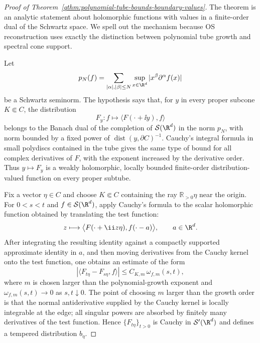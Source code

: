 \begin{proof}[Proof of Theorem~\ref{qthm:polynomial-tube-bounds-boundary-values}]
The theorem is an analytic statement about holomorphic functions with values
in a finite-order dual of the Schwartz space.  We spell out the mechanism
because OS reconstruction uses exactly the distinction between polynomial
tube growth and spectral cone support.

Let
\[
  p_N(f)
  =
  \sum_{|\alpha|,|\beta|\le N}
    \sup_{x\in\R^d}|x^\beta\partial^\alpha f(x)|
\]
be a Schwartz seminorm.  The hypothesis says that, for \(y\) in every proper
subcone \(K\Subset C\), the distribution
\[
  F_y:f\longmapsto \langle F(\cdot+\ii y),f\rangle
\]
belongs to the Banach dual of the completion of
\(\mathcal S(\R^d)\) in the norm \(p_N\), with norm bounded by a fixed power
of \(\operatorname{dist}(y,\partial C)^{-1}\).  Cauchy's integral formula in
small polydiscs contained in the tube gives the same type of bound for all
complex derivatives of \(F\), with the exponent increased by the derivative
order.  Thus \(y\mapsto F_y\) is a weakly holomorphic, locally bounded
finite-order distribution-valued function on every proper subtube.

Fix a vector \(\eta\in C\) and choose \(K\Subset C\) containing the ray
\(\mathbb R_{>0}\eta\) near the origin.  For \(0<s<t\) and
\(f\in\mathcal S(\R^d)\), apply Cauchy's formula to the scalar holomorphic
function obtained by translating the test function:
\[
  z\longmapsto
  \bigl\langle F(\cdot+\ii z\eta), f(\cdot-a)\bigr\rangle ,
  \qquad a\in\R^d .
\]
After integrating the resulting identity against a compactly supported
approximate identity in \(a\), and then moving derivatives from the Cauchy
kernel onto the test function, one obtains an estimate of the form
\begin{equation}
  |\langle F_{t\eta}-F_{s\eta},f\rangle|
  \le
  C_{K,m}\,
  \omega_{f,m}(s,t),
  \label{eq:os-tube-boundary-cauchy}
\end{equation}
where \(m\) is chosen larger than the polynomial-growth exponent and
\(\omega_{f,m}(s,t)\to0\) as \(s,t\downarrow0\).  The point of choosing
\(m\) larger than the growth order is that the normal antiderivative supplied
by the Cauchy kernel is locally integrable at the edge; all singular powers
are absorbed by finitely many derivatives of the test function.  Hence
\(\{F_{t\eta}\}_{t>0}\) is Cauchy in \(\mathcal S'(\R^d)\) and defines a
tempered distribution \(b_\eta\).


\end{proof}
